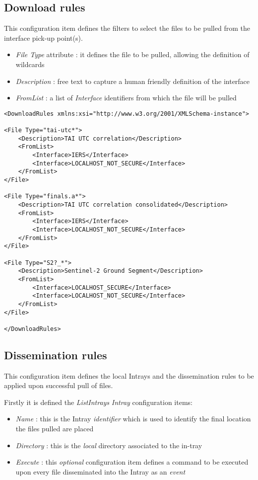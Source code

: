 \documentclass[dec_sum_main.tex]{subfiles}
\begin{document}
\subsection{Download rules}
This configuration item defines the filters to select the files to be pulled from the interface pick-up point(s).
\par
\noindent
\begin{itemize}
	\item \textit{File Type} attribute : it defines the file to be pulled, allowing the definition of wildcards
	\item \textit{Description} : free text to capture a human friendly definition of the interface 
	\item \textit{FromList} : a list of \textit{Interface} identifiers from which the file will be pulled
\end{itemize}
\par
\noindent
\begin{lstlisting}
<DownloadRules xmlns:xsi="http://www.w3.org/2001/XMLSchema-instance">

<File Type="tai-utc*">
	<Description>TAI UTC correlation</Description>
	<FromList>
		<Interface>IERS</Interface>
		<Interface>LOCALHOST_NOT_SECURE</Interface>
	</FromList>
</File>

<File Type="finals.a*">
	<Description>TAI UTC correlation consolidated</Description>
	<FromList>
		<Interface>IERS</Interface>
		<Interface>LOCALHOST_NOT_SECURE</Interface>
	</FromList>
</File>

<File Type="S2?_*">
	<Description>Sentinel-2 Ground Segment</Description>
	<FromList>
		<Interface>LOCALHOST_SECURE</Interface>
		<Interface>LOCALHOST_NOT_SECURE</Interface>
	</FromList>
</File>

</DownloadRules>

\end{lstlisting}

\subsection{Dissemination rules}

\label{Dissemination rules}
This configuration item defines the local Intrays and the dissemination rules to be applied upon successful pull of files.
\par
\noindent
Firstly it is defined the \textit{ListIntrays} \textit{Intray} configuration items:
\par
\noindent
\begin{itemize}
	\item \textit{Name} : this is the Intray \textit{identifier} which is used to identify the final location the files pulled are placed
 	\item \textit{Directory} : this is the \textit{local} directory associated to the in-tray
 	\item \textit{Execute} : this \textit{optional} configuration item defines a command to be executed upon every file disseminated into the Intray as an \textit{event} 	
\end{itemize}
\end{document}
